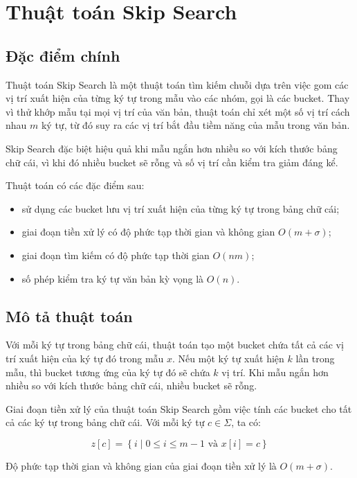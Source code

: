 \section{Thuật toán Skip Search}

\subsection{Đặc điểm chính}

Thuật toán Skip Search là một thuật toán tìm kiếm chuỗi dựa trên việc gom các vị trí xuất hiện của từng ký tự trong mẫu vào các nhóm, gọi là các bucket. Thay vì thử khớp mẫu tại mọi vị trí của văn bản, thuật toán chỉ xét một số vị trí cách nhau $m$ ký tự, từ đó suy ra các vị trí bắt đầu tiềm năng của mẫu trong văn bản.

Skip Search đặc biệt hiệu quả khi mẫu ngắn hơn nhiều so với kích thước bảng chữ cái, vì khi đó nhiều bucket sẽ rỗng và số vị trí cần kiểm tra giảm đáng kể.

Thuật toán có các đặc điểm sau:

\begin{itemize}
    \item sử dụng các bucket lưu vị trí xuất hiện của từng ký tự trong bảng chữ cái;
    \item giai đoạn tiền xử lý có độ phức tạp thời gian và không gian $O(m + \sigma)$;
    \item giai đoạn tìm kiếm có độ phức tạp thời gian $O(nm)$;
    \item số phép kiểm tra ký tự văn bản kỳ vọng là $O(n)$.
\end{itemize}

\subsection{Mô tả thuật toán}

Với mỗi ký tự trong bảng chữ cái, thuật toán tạo một bucket chứa tất cả các vị trí xuất hiện của ký tự đó trong mẫu $x$. Nếu một ký tự xuất hiện $k$ lần trong mẫu, thì bucket tương ứng của ký tự đó sẽ chứa $k$ vị trí. Khi mẫu ngắn hơn nhiều so với kích thước bảng chữ cái, nhiều bucket sẽ rỗng.

Giai đoạn tiền xử lý của thuật toán Skip Search gồm việc tính các bucket cho tất cả các ký tự trong bảng chữ cái. Với mỗi ký tự $c \in \Sigma$, ta có:

\[
z[c] = \left\{ i \mid 0 \leq i \leq m - 1 \text{ và } x[i] = c \right\}
\]

Độ phức tạp thời gian và không gian của giai đoạn tiền xử lý là $O(m + \sigma)$.

